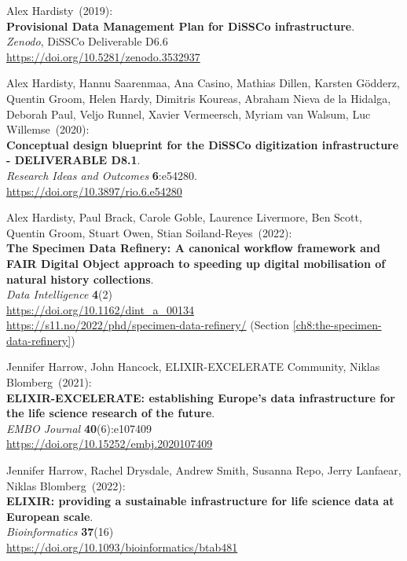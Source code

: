 \begin{thebibliography}{9}
Alex Hardisty~(2019): \\
\textbf{Provisional Data Management Plan for DiSSCo infrastructure}.\\ 
\emph{Zenodo}, DiSSCo Deliverable D6.6\\
\url{https://doi.org/10.5281/zenodo.3532937}

Alex Hardisty, Hannu Saarenmaa, Ana Casino, Mathias Dillen, Karsten Gödderz, Quentin Groom, Helen Hardy, Dimitris Koureas, Abraham Nieva de la Hidalga, Deborah Paul, Veljo Runnel, Xavier Vermeersch, Myriam van Walsum, Luc Willemse~(2020): \\
\textbf{Conceptual design blueprint for the DiSSCo digitization infrastructure - DELIVERABLE D8.1}.\\ 
\emph{Research Ideas and Outcomes} \textbf{6}:e54280.\\
\url{https://doi.org/10.3897/rio.6.e54280}

Alex Hardisty, Paul Brack, Carole Goble, Laurence Livermore, Ben Scott, Quentin Groom, Stuart Owen, Stian Soiland-Reyes~(2022): \\
\textbf{The Specimen Data Refinery: A canonical workflow framework and FAIR Digital Object approach to speeding up digital mobilisation of natural history collections}.\\
\emph{Data Intelligence} \textbf{4}(2)\\
\url{https://doi.org/10.1162/dint_a_00134}\\
\url{https://s11.no/2022/phd/specimen-data-refinery/}
(Section \vref{ch8:the-specimen-data-refinery})

Jennifer Harrow, John Hancock, ELIXIR-EXCELERATE Community, Niklas Blomberg~(2021): \\
\textbf{ELIXIR-EXCELERATE: establishing Europe's data infrastructure for the life science research of the future}.\\
\emph{EMBO Journal} \textbf{40}(6):e107409\\
\url{https://doi.org/10.15252/embj.2020107409}

Jennifer Harrow, Rachel Drysdale, Andrew Smith, Susanna Repo, Jerry Lanfaear, Niklas Blomberg~(2022): \\
\textbf{ELIXIR: providing a sustainable infrastructure for life science data at European scale}.\\
\emph{Bioinformatics} \textbf{37}(16)\\
\url{https://doi.org/10.1093/bioinformatics/btab481}


\end{thebibliography}
